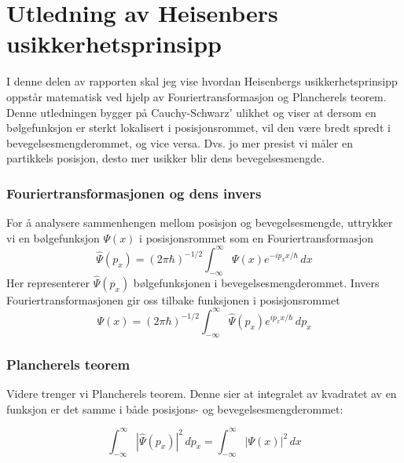 \documentclass{article}
\begin{document}
\section{Utledning av Heisenbers usikkerhetsprinsipp}
I denne delen av rapporten skal jeg vise hvordan Heisenbergs usikkerhetsprinsipp oppstår matematisk ved hjelp av Fouriertransformasjon og Plancherels teorem. Denne utledningen bygger på Cauchy-Schwarz’ ulikhet og viser at dersom en bølgefunksjon er sterkt lokalisert i posisjonsrommet, vil den være bredt spredt i bevegelsesmengderommet, og vice versa. Dvs. jo mer presist vi måler en partikkels posisjon, desto mer usikker blir dens bevegelsesmengde.  

\vspace{0.2 in}

\subsubsection{Fouriertransformasjonen og dens invers}
For å analysere sammenhengen mellom posisjon og bevegelsesmengde, uttrykker vi en bølgefunksjon $\Psi(x)$ i posisjonsrommet som en Fouriertransformasjon
\begin{equation}
    \widehat{\Psi}(p_x) = (2\pi\hbar)^{-1/2}\int_{-\infty}^{\infty}\Psi(x)e^{-ip_xx/\hbar}\, dx \label{eq:1}
\end{equation}
Her representerer $\widehat{\Psi}(p_x)$ bølgefunksjonen i bevegelsesmengderommet. Invers Fouriertransformasjonen gir oss tilbake funksjonen i posisjonsrommet
\begin{equation}
    \Psi(x) = (2\pi\hbar)^{-1/2}\int_{-\infty}^{\infty} \widehat{\Psi}(p_x)e^{ip_xx/\hbar}\, dp_x \label{eq:2}
\end{equation}


\subsubsection{Plancherels teorem}
Videre trenger vi Plancherels teorem. Denne sier at integralet av kvadratet av en funksjon er det samme i både posisjons- og bevegelsesmengderommet:

\vspace{0.1in}

\begin{equation}
    \int_{-\infty}^{\infty}|\widehat{\Psi}(p_x)|^2 \, dp_x = \int_{-\infty}^{\infty}|\Psi(x)|^2\, dx \label{eq:3}
\end{equation}

\vspace{2.3in}
\end{document}
